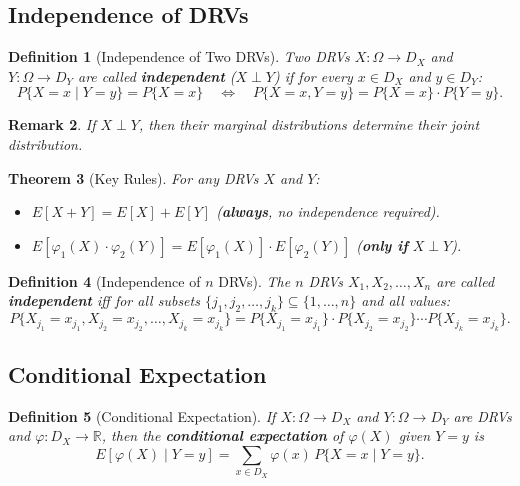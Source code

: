 \documentclass[12pt]{article}
\theoremstyle{definition_style}
\newtheorem{defn}{Definition}[section]
\newtheorem{thm}[defn]{Theorem}
\newtheorem{remark}[defn]{Remark}
\begin{document}
\subsection{Independence of DRVs}

\begin{defn}[Independence of Two DRVs]
Two DRVs $X: \Omega \to D_X$ and $Y: \Omega \to D_Y$ are called \textbf{independent} ($X \perp Y$) if for every $x \in D_X$ and $y \in D_Y$:
\[
    P\{X = x \mid Y = y\} = P\{X = x\} \quad \Longleftrightarrow \quad P\{X = x, Y = y\} = P\{X = x\} \cdot P\{Y = y\}.
\]
\end{defn}

\begin{remark}
If $X \perp Y$, then their marginal distributions \emph{determine} their joint distribution.
\end{remark}

\begin{thm}[Key Rules]
For any DRVs $X$ and $Y$:
\begin{itemize}
    \item $E[X + Y] = E[X] + E[Y]$ \quad (\textbf{always}, no independence required).
    \item $E[\varphi_1(X) \cdot \varphi_2(Y)] = E[\varphi_1(X)] \cdot E[\varphi_2(Y)]$ \quad (\textbf{only if} $X \perp Y$).
\end{itemize}
\end{thm}

\begin{defn}[Independence of $n$ DRVs]
The $n$ DRVs $X_1, X_2, \ldots, X_n$ are called \textbf{independent} iff for all subsets $\{j_1, j_2, \ldots, j_k\} \subseteq \{1,\ldots,n\}$ and all values:
\[
    P\{X_{j_1} = x_{j_1}, X_{j_2} = x_{j_2}, \ldots, X_{j_k} = x_{j_k}\} = P\{X_{j_1} = x_{j_1}\} \cdot P\{X_{j_2} = x_{j_2}\} \cdots P\{X_{j_k} = x_{j_k}\}.
\]
\end{defn}

\subsection{Conditional Expectation}

\begin{defn}[Conditional Expectation]
If $X: \Omega \to D_X$ and $Y: \Omega \to D_Y$ are DRVs and $\varphi: D_X \to \mathbb{R}$, then the \textbf{conditional expectation} of $\varphi(X)$ given $Y = y$ is
\[
    E[\varphi(X) \mid Y = y] = \sum_{x \in D_X} \varphi(x) \, P\{X = x \mid Y = y\}.
\]
\end{defn}
\end{document}
